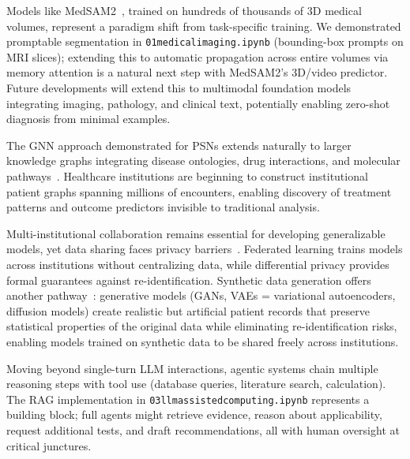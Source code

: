 \documentclass[krantz2,ChapterTOCs]{krantz}
\newcommand{\notebook}[1]{\texttt{\def\_{\textunderscore\allowbreak}#1}}
\begin{document}
\begin{description}[style=nextline, leftmargin=1em, labelindent=0pt, itemsep=0.2ex]
\item[Foundation models for medical imaging]
Models like MedSAM2~\citep{ma2025medsam2}, trained on hundreds of thousands of 3D medical volumes, represent a paradigm shift from task-specific training.
We demonstrated promptable segmentation in \notebook{01\_medical\_imaging.ipynb} (bounding-box prompts on MRI slices); extending this to automatic propagation across entire volumes via memory attention is a natural next step with MedSAM2's 3D/video predictor.
Future developments will extend this to multimodal foundation models integrating imaging, pathology, and clinical text, potentially enabling zero-shot diagnosis from minimal examples.

\item[Graph-based learning at scale]
The GNN approach demonstrated for PSNs extends naturally to larger knowledge graphs integrating disease ontologies, drug interactions, and molecular pathways~\citep{wang2024knowddi}.
Healthcare institutions are beginning to construct institutional patient graphs spanning millions of encounters, enabling discovery of treatment patterns and outcome predictors invisible to traditional analysis.

\item[Federated and privacy-preserving learning]
Multi-institutional collaboration remains essential for developing generalizable models, yet data sharing faces privacy barriers~\citep{teo2024federated}.
Federated learning trains models across institutions without centralizing data, while differential privacy provides formal guarantees against re-identification.
Synthetic data generation offers another pathway~\citep{giuffre2023synthetic}: generative models (GANs, VAEs = variational autoencoders, diffusion models) create realistic but artificial patient records that preserve statistical properties of the original data while eliminating re-identification risks, enabling models trained on synthetic data to be shared freely across institutions.

\item[Agentic AI workflows]
Moving beyond single-turn LLM interactions, agentic systems chain multiple reasoning steps with tool use (database queries, literature search, calculation).
The RAG implementation in \notebook{03\_llm\_assisted\_computing.ipynb} represents a building block; full agents might retrieve evidence, reason about applicability, request additional tests, and draft recommendations, all with human oversight at critical junctures.


\end{description}
\end{document}
